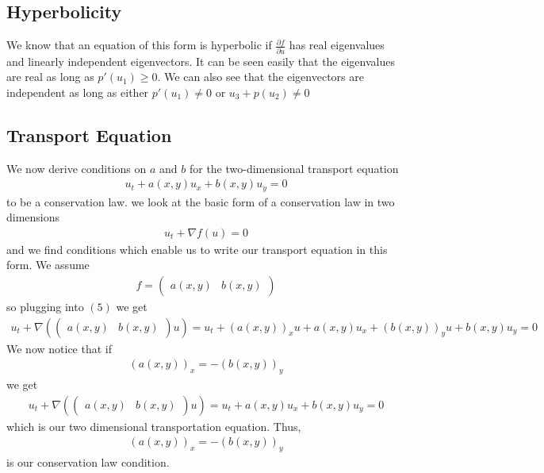 \subsection{Hyperbolicity}
We know that an equation of this form is hyperbolic if $\frac{\partial f}{\partial u}$ has real eigenvalues and linearly independent eigenvectors. It can be seen easily that the eigenvalues are real as long as $p'(u_1) \geq 0$. We can also see that the eigenvectors are independent as long as either $p'(u_1) \neq 0$ or $u_3+p(u_2) \neq 0$
\subsection{Transport Equation}
We now derive conditions on $a$ and $b$ for the two-dimensional transport equation 
\begin{align*}
u_t + a(x,y)u_x + b(x,y) u_y = 0
\end{align*} to be a conservation law. 
we look at the basic form of a conservation law in two dimensions
\begin{align}
u_t + \nabla f(u) = 0
\end{align}
and we find conditions which enable us to write our transport equation in this form. 
We assume 
\begin{align*}
f = \begin{pmatrix}
a(x,y) & b(x,y)
\end{pmatrix}
\end{align*}
so plugging into $(5)$ we get
\begin{align*}
u_t + \nabla (\begin{pmatrix}
a(x,y) & b(x,y)
\end{pmatrix} u) = u_t + (a(x,y))_x u + a(x,y) u_x + (b(x,y))_y u + b(x,y) u_y = 0
\end{align*}
We now notice that if 
\begin{align*}
(a(x,y))_x = - (b(x,y))_y
\end{align*}
we get 
\begin{align*}
u_t + \nabla (\begin{pmatrix}
a(x,y) & b(x,y)
\end{pmatrix} u) = u_t + a(x,y) u_x + b(x,y) u_y = 0
\end{align*}
which is our two dimensional transportation equation. Thus,
\begin{align*}
(a(x,y))_x = - (b(x,y))_y
\end{align*} is our conservation law condition. 